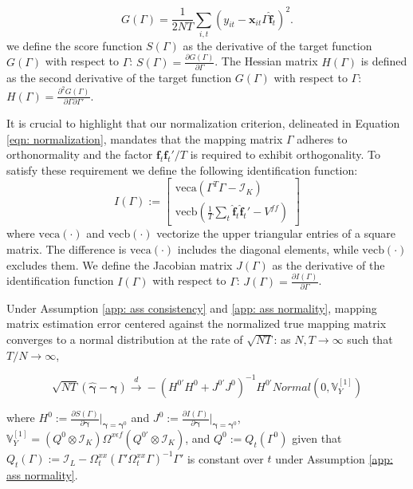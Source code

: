 \documentclass[12pt]{article}
\begin{document}
\begin{equation}
\label{eqn: target}
G(\Gamma) = \frac{1}{2NT}\sum_{i,t} \left( y_{it} - \mathbf{x}_{it}\Gamma \mathbf{\hat{f}}_t \right)^2.
\end{equation}
we define the score function $S(\Gamma)$ as the derivative of the target function $G(\Gamma)$ with respect to $\Gamma$: $S(\Gamma) = \frac{\partial G(\Gamma)}{\partial \Gamma}$. The Hessian matrix $H(\Gamma)$ is defined as the second derivative of the target function $G(\Gamma)$ with respect to $\Gamma$: $H(\Gamma) = \frac{\partial^2 G(\Gamma)}{\partial \Gamma \partial \Gamma'}$. 

It is crucial to highlight that our normalization criterion, delineated in Equation \ref{eqn: normalization}, mandates that the mapping matrix $\Gamma$ adheres to orthonormality and the factor $\mathbf{f}_t\mathbf{f}_t'/T$ is required to exhibit orthogonality. To satisfy these requirement we define the following identification function:
\begin{equation}
\label{eqn: identification}
I(\Gamma) := \begin{bmatrix}
    \text{veca}(\Gamma^T \Gamma - \mathcal{I}_K) \\
    \text{vecb}\left(\frac{1}{T} \sum_{t} \mathbf{\hat{f}}_t\mathbf{\hat{f}}_t' - V^{ff}\right)
    \end{bmatrix}
\end{equation}
where $\text{veca}(\cdot)$ and $\text{vecb}(\cdot)$ vectorize the upper triangular entries of a square matrix. The difference is $\text{veca}(\cdot)$ includes the diagonal elements, while $\text{vecb}(\cdot)$ excludes them. We define the Jacobian matrix $J(\Gamma)$ as the derivative of the identification function $I(\Gamma)$ with respect to $\Gamma$: $J(\Gamma) = \frac{\partial I(\Gamma)}{\partial \Gamma}$.

\begin{proposition}
\label{prop: gamma}
Under Assumption \ref{app: ass consistency} and \ref{app: ass normality}, mapping matrix estimation error centered against the normalized true mapping matrix converges to a normal distribution at the rate of $\sqrt{NT}$: as $N, T \rightarrow \infty$ such that $T/N \rightarrow \infty$,

$$
\sqrt{NT} \left( \hat{\mathbf{\gamma}} - \mathbf{\gamma} \right) \xrightarrow{d} - \left( H^{0'}H^0 + J^{0'}J^0 \right)^{-1}H^{0'}Normal(0, \mathbb{V}_Y^{[1]})
$$
\end{proposition}
where $H^0:= \frac{\partial S(\Gamma)}{\partial \mathbf{\gamma}}|_{\mathbf{\gamma} = \mathbf{\gamma}^0}$ and $J^0:= \frac{\partial I(\Gamma)}{\partial \mathbf{\gamma}}|_{\mathbf{\gamma} = \mathbf{\gamma}^0}$, $\mathbb{V}_Y^{[1]} = \left( Q^0 \otimes \mathcal{I}_K \right) \Omega^{x\epsilon f} \left( Q^{0'} \otimes \mathcal{I}_K \right)$, and $Q^0 := Q_t(\Gamma^0)$ given that $Q_t(\Gamma) := \mathcal{I}_L - \Omega_t^{xx} \left( \Gamma' \Omega^{xx}_t \Gamma \right)^{-1}\Gamma'$ is constant over $t$ under Assumption \ref{app: ass normality}.
\end{document}
